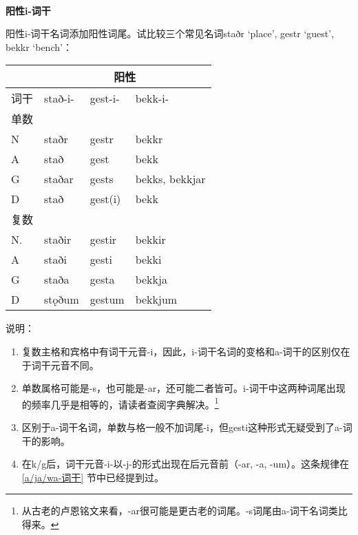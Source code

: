 ~\\
\textbf{阳性i-词干}

阳性i-词干名词添加阳性词尾。试比较三个常见名词staðr `place', gestr
`guest', bekkr `bench'：

\begin{longtable}{llll}
    \toprule
         & \multicolumn{3}{c}{\textbf{阳性}}                            \\
    \midrule
    \endhead
    \bottomrule
    \endfoot
    词干 & stað-i-                  & gest-i- & bekk-i-        \\
    单数 &                          &         &                \\
    N    & staðr                    & gestr   & bekkr          \\
    A    & stað                     & gest    & bekk           \\
    G    & staðar                   & gests   & bekks, bekkjar \\
    D    & stað                     & gest(i) & bekk           \\
    复数 &                          &         &                \\
    N.   & staðir                   & gestir  & bekkir         \\
    A    & staði                    & gesti   & bekki          \\
    G    & staða                    & gesta   & bekkja         \\
    D    & stǫðum                   & gestum  & bekkjum        \\
  \end{longtable}
  
  说明：
  
  \begin{enumerate}[1)]
    \item
          复数主格和宾格中有词干元音-i，因此，i-词干名词的变格和a-词干的区别仅在于词干元音不同。
    \item
          单数属格可能是-s，也可能是-ar，还可能二者皆可。i-词干中这两种词尾出现的频率几乎是相等的，请读者查阅字典解决。\footnote{从古老的卢恩铭文来看，-ar很可能是更古老的词尾。-s词尾由a-词干名词类比得来。}
    \item
          区别于a-词干名词，单数与格一般不加词尾-i，但gesti这种形式无疑受到了a-词干的影响。
    \item
          在k/g后，词干元音-i-以-j-的形式出现在后元音前（-ar, -a,
          -um）。这条规律在 \ref{a/ja/wa-词干} 节中已经提到过。
  \end{enumerate}

